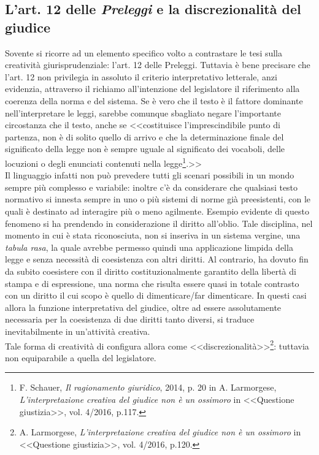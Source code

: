 \subsection{L'art. 12 delle \textit{Preleggi} e la discrezionalità del giudice}
Sovente si ricorre ad un elemento specifico volto a contrastare le tesi sulla creatività giurisprudenziale: l'art. 12 delle Preleggi. Tuttavia è bene precisare che l'art. 12 non privilegia in assoluto il criterio interpretativo letterale, anzi evidenzia, attraverso il richiamo all'intenzione del legislatore il riferimento alla coerenza della norma e del sistema.
Se è vero che il testo è il fattore dominante nell'interpretare le leggi, sarebbe comunque sbagliato negare l'importante circostanza che il testo, anche se <<costituisce l'imprescindibile punto di partenza, non è di solito quello di arrivo e che la determinazione finale del significato della legge non è sempre uguale al significato dei vocaboli, delle locuzioni o degli enunciati contenuti nella legge\footnote{F. Schauer, \textit{Il ragionamento giuridico}, 2014, p. 20 in A. Larmorgese, \textit{L’interpretazione creativa del giudice non è un ossimoro} in <<Questione giustizia>>, vol. 4/2016, p.117.}.>>
\\Il linguaggio infatti non può prevedere tutti gli scenari possibili in un mondo sempre più complesso e variabile: inoltre c'è da considerare che qualsiasi testo normativo si innesta sempre in uno o più sistemi di norme già preesistenti, con le quali è destinato ad interagire più o meno agilmente. Esempio evidente di questo fenomeno si ha prendendo in considerazione il diritto all'oblio. Tale disciplina, nel momento in cui è stata riconosciuta, non si inseriva in un sistema vergine, una \textit{tabula rasa}, la quale avrebbe permesso quindi una applicazione limpida della legge e senza necessità di coesistenza con altri diritti. Al contrario, ha dovuto fin da subito coesistere con il diritto costituzionalmente garantito della libertà di stampa e di espressione, una norma che risulta essere quasi in totale contrasto con un diritto il cui scopo è quello di dimenticare/far dimenticare.
In questi casi allora la funzione interpretativa del giudice, oltre ad essere assolutamente necessaria per la coesistenza di due diritti tanto diversi, si traduce inevitabilmente in un'attività creativa.
\\Tale forma di creatività di configura allora come <<discrezionalità>>\footnote{A. Larmorgese, \textit{L’interpretazione creativa del giudice non è un ossimoro} in <<Questione giustizia>>, vol. 4/2016, p.120.}: tuttavia non equiparabile a quella del legislatore.
